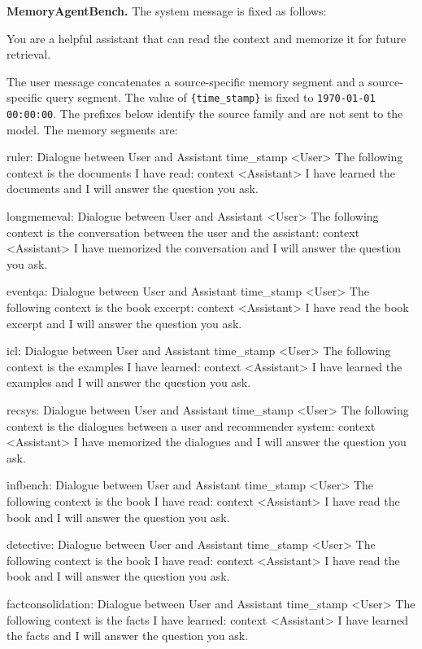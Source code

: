 \textbf{MemoryAgentBench.}
The system message is fixed as follows:

\begin{promptbox}
You are a helpful assistant that can read the context and memorize it for future retrieval.
\end{promptbox}

The user message concatenates a source-specific memory segment and a source-specific query segment. The value of \texttt{\{time\_stamp\}} is fixed to \texttt{1970-01-01 00:00:00}. The prefixes below identify the source family and are not sent to the model. The memory segments are:

\begin{promptbox}
ruler: Dialogue between User and Assistant {time_stamp}
<User> The following context is the documents I have read:
{context}
<Assistant> I have learned the documents and I will answer the question you ask.

longmemeval: Dialogue between User and Assistant
<User> The following context is the conversation between the user and the assistant:
{context}
<Assistant> I have memorized the conversation and I will answer the question you ask.

eventqa: Dialogue between User and Assistant {time_stamp}
<User> The following context is the book excerpt:
{context}
<Assistant> I have read the book excerpt and I will answer the question you ask.

icl: Dialogue between User and Assistant {time_stamp}
<User> The following context is the examples I have learned:
{context}
<Assistant> I have learned the examples and I will answer the question you ask.

recsys: Dialogue between User and Assistant {time_stamp}
<User> The following context is the dialogues between a user and recommender system:
{context}
<Assistant> I have memorized the dialogues and I will answer the question you ask.

infbench: Dialogue between User and Assistant {time_stamp}
<User> The following context is the book I have read:
{context}
<Assistant> I have read the book and I will answer the question you ask.

detective: Dialogue between User and Assistant {time_stamp}
<User> The following context is the book I have read:
{context}
<Assistant> I have read the book and I will answer the question you ask.

factconsolidation: Dialogue between User and Assistant {time_stamp}
<User> The following context is the facts I have learned:
{context}
<Assistant> I have learned the facts and I will answer the question you ask.
\end{promptbox}

